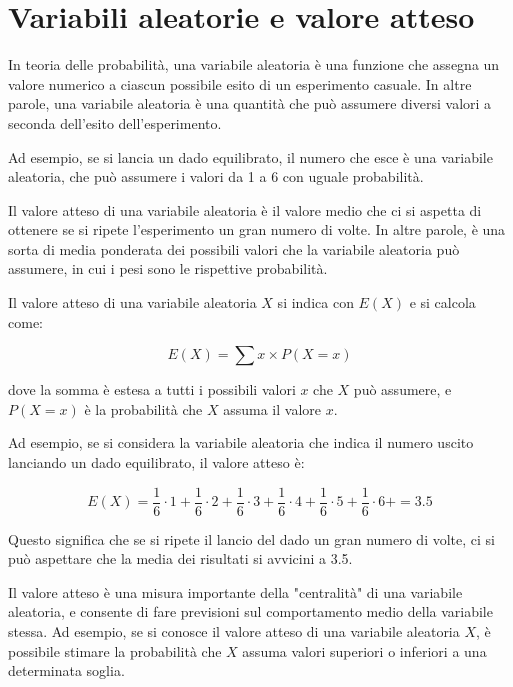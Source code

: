 \chapter{Variabili aleatorie e valore atteso}
In teoria delle probabilità, una variabile aleatoria è una funzione che assegna un valore
numerico a ciascun possibile esito di un esperimento casuale. In altre parole, 
una variabile aleatoria è una quantità che può assumere diversi valori a seconda
dell'esito dell'esperimento.

Ad esempio, se si lancia un dado equilibrato, il numero che esce è una variabile
aleatoria, che può assumere i valori da 1 a 6 con uguale probabilità.

Il valore atteso di una variabile aleatoria è
il valore medio che ci si aspetta di ottenere se si ripete l'esperimento
un gran numero di volte. In altre parole, è una sorta di media ponderata
dei possibili valori che la variabile aleatoria può assumere, 
in cui i pesi sono le rispettive probabilità.

Il valore atteso di una variabile aleatoria $X$
si indica con $E(X)$ e si calcola come:

\begin{equation}
  E(X) = \sum x \times P(X = x)
\end{equation}

dove la somma è estesa a tutti i possibili valori $x$ che $X$ può assumere,
e $P(X = x)$ è la probabilità che $X$ assuma il valore $x$.

Ad esempio, se si considera la variabile aleatoria che indica il numero
uscito lanciando un dado equilibrato, il valore atteso è:

\begin{equation}
  E(X) = 
        \frac{1}{6} \cdot 1 + 
        \frac{1}{6} \cdot 2 + 
        \frac{1}{6} \cdot 3 +
        \frac{1}{6} \cdot 4 +
        \frac{1}{6} \cdot 5 +
        \frac{1}{6} \cdot 6 +
        = 3.5
\end{equation}

Questo significa che se si ripete il lancio del dado un gran numero di volte,
ci si può aspettare che la media dei risultati si avvicini a 3.5.

Il valore atteso è una misura importante della "centralità" di una variabile aleatoria,
e consente di fare previsioni sul comportamento medio della variabile stessa. Ad esempio,
se si conosce il valore atteso di una variabile aleatoria $X$, è possibile stimare la 
probabilità che $X$ assuma valori superiori o inferiori a una determinata soglia.



